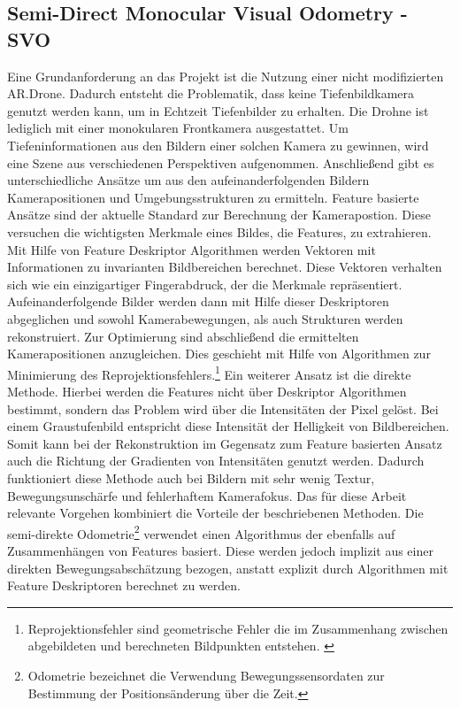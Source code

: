 \subsection{Semi-Direct Monocular Visual Odometry - SVO}
Eine Grundanforderung an das Projekt ist die Nutzung einer nicht modifizierten AR.Drone. Dadurch entsteht die Problematik, dass keine Tiefenbildkamera genutzt werden kann, um in Echtzeit Tiefenbilder zu erhalten. Die Drohne ist lediglich mit einer monokularen Frontkamera ausgestattet. \newline
Um Tiefeninformationen aus den Bildern einer solchen Kamera zu gewinnen, wird eine Szene aus verschiedenen Perspektiven aufgenommen. Anschließend gibt es unterschiedliche Ansätze um aus den aufeinanderfolgenden Bildern Kamerapositionen und Umgebungsstrukturen zu ermitteln. \newline
Feature basierte Ansätze sind der aktuelle Standard zur Berechnung der Kamerapostion. Diese versuchen die wichtigsten Merkmale eines Bildes, die Features, zu extrahieren. Mit Hilfe von Feature Deskriptor Algorithmen werden Vektoren mit Informationen zu invarianten Bildbereichen berechnet. Diese Vektoren verhalten sich wie ein einzigartiger Fingerabdruck, der die Merkmale repräsentiert. \newline
Aufeinanderfolgende Bilder werden dann mit Hilfe dieser Deskriptoren abgeglichen und sowohl Kamerabewegungen, als auch Strukturen werden rekonstruiert. Zur Optimierung sind abschließend die ermittelten Kamerapositionen anzugleichen. Dies geschieht mit Hilfe von Algorithmen zur Minimierung des Reprojektionsfehlers.\footnote{Reprojektionsfehler sind geometrische Fehler die im Zusammenhang zwischen abgebildeten und berechneten Bildpunkten entstehen. \cite{repro}} 
\newline
Ein weiterer Ansatz ist die direkte Methode. Hierbei werden die Features nicht über Deskriptor Algorithmen bestimmt, sondern das Problem wird über die Intensitäten der Pixel gelöst. Bei einem Graustufenbild entspricht diese Intensität der Helligkeit von Bildbereichen. \newline
Somit kann bei der Rekonstruktion im Gegensatz zum Feature basierten Ansatz auch die Richtung der Gradienten von Intensitäten genutzt werden. Dadurch funktioniert diese Methode auch bei Bildern mit sehr wenig Textur, Bewegungsunschärfe und fehlerhaftem Kamerafokus. \newline
Das für diese Arbeit relevante Vorgehen kombiniert die Vorteile der beschriebenen Methoden. Die semi-direkte Odometrie\footnote{Odometrie bezeichnet die Verwendung Bewegungssensordaten zur Bestimmung der Positionsänderung über die Zeit.\cite{hodor}} verwendet einen Algorithmus der ebenfalls auf Zusammenhängen von Features basiert. Diese werden jedoch implizit aus einer direkten Bewegungsabschätzung bezogen, anstatt explizit durch Algorithmen mit Feature Deskriptoren berechnet zu werden. \newline
